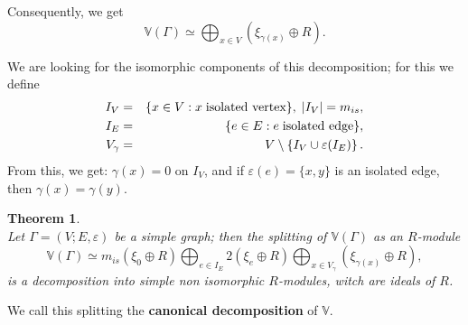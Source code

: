 \documentclass[preprint,12pt,authoryear]{elsarticle}
\newtheorem{thm}{Theorem}[section]
\theoremstyle{definition}
\begin{document}
Consequently, we get 
\begin{equation}
\mathbb{V}(\Gamma)\simeq \bigoplus_{x \in V} \left(\xi_{\gamma(x)}\oplus R\right).
\end{equation}

We are looking for the isomorphic components of this decomposition; for this we define 
\begin{eqnarray*}
I_V                    &=& \{x \in V : x \textrm{\;isolated vertex} \} ,\; \vert I_V \vert =m_{is},\\
I_{E}&=& \{e \in E : e \textrm{\;isolated edge} \},\\
V_{\gamma}    &= & V \setminus \left\{I_V \cup \varepsilon (I_{E})\right\}.
\end{eqnarray*}
From this, we get: $\gamma(x) = 0 $ on $I_V$, and if $\varepsilon(e)=\{x, y\}$ is an isolated edge, then $\gamma(x)=\gamma(y)$. 




\begin{thm}\label{canondecomposition}\textrm{} \\
Let $\Gamma=(V;E, \varepsilon)$ be a simple  graph; then the  splitting of $\mathbb{V}(\Gamma)$ as an $R$-module 
\begin{equation}
\mathbb{V}(\Gamma) \simeq m_{is} \left(\xi_{0}\oplus R\right)\bigoplus_{e\in I_{E}} 2 \left(\xi_{e}\oplus R\right) \bigoplus_{x \in V_{\gamma}} \left(\xi_{\gamma(x)}\oplus R\right),
\end{equation}
is a decomposition into simple non isomorphic $R$-modules, witch are ideals of $R$.
\end{thm}
We call this splitting the {\bf canonical decomposition} of $\mathbb{V}$.
\end{document}
